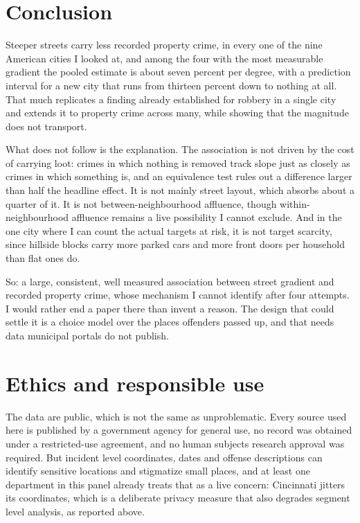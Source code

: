 \documentclass[11pt,letterpaper]{article}
\begin{document}
\section{Conclusion}

Steeper streets carry less recorded property crime, in every one of the nine American
cities I looked at, and among the four with the most measurable gradient the pooled
estimate is about seven percent per degree, with a prediction interval for a new city
that runs from thirteen percent down to nothing at all. That much replicates a finding
already established for robbery in a single city and extends it to property crime
across many, while showing that the magnitude does not transport.

What does not follow is the explanation. The association is not driven by the cost of
carrying loot: crimes in which nothing is removed track slope just as closely as
crimes in which something is, and an equivalence test rules out a difference larger
than half the headline effect. It is not mainly street layout, which absorbs about a
quarter of it. It is not between-neighbourhood affluence, though within-neighbourhood
affluence remains a live possibility I cannot exclude. And in the one city where I can
count the actual targets at risk, it is not target scarcity, since hillside blocks
carry more parked cars and more front doors per household than flat ones do.

So: a large, consistent, well measured association between street gradient and
recorded property crime, whose mechanism I cannot identify after four attempts. I
would rather end a paper there than invent a reason. The design that could settle it
is a choice model over the places offenders passed up, and that needs data municipal
portals do not publish.

\section{Ethics and responsible use}

The data are public, which is not the same as unproblematic. Every source used here
is published by a government agency for general use, no record was obtained under a
restricted-use agreement, and no human subjects research approval was required. But
incident level coordinates, dates and offense descriptions can identify sensitive
locations and stigmatize small places, and at least one department in this panel
already treats that as a live concern: Cincinnati jitters its coordinates, which is a
deliberate privacy measure that also degrades segment level analysis, as reported
above.
\end{document}
